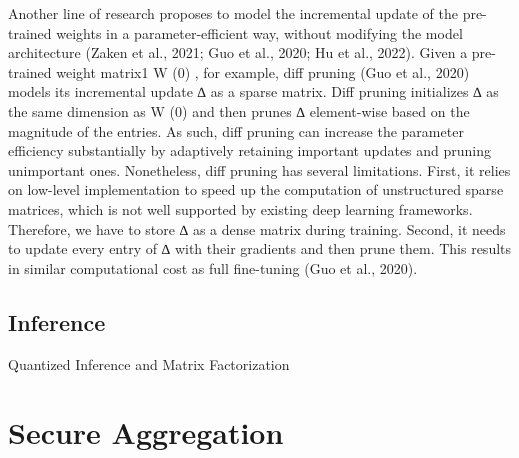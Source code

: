 \documentclass[withindex,glossary]{cam-thesis}
\begin{document}
Another line of research proposes to model the incremental update of the pre-trained weights in a parameter-efficient way, without modifying the model architecture (Zaken et al., 2021; Guo et al., 2020; Hu et al., 2022). Given a pre-trained weight matrix1 W (0) , for example, diff pruning (Guo et al., 2020) models its incremental update ∆ as a sparse matrix. Diff pruning initializes ∆ as the same dimension as W (0) and then prunes ∆ element-wise based on the magnitude of the entries. As such, diff pruning can increase the parameter efficiency substantially by adaptively retaining important updates and pruning unimportant ones. Nonetheless, diff pruning has several limitations. First, it relies on low-level implementation to speed up the computation of unstructured sparse matrices, which is not well supported by existing deep learning frameworks. Therefore, we have to store ∆ as a dense matrix during training. Second, it needs to update every entry of ∆ with their gradients and then prune them. This results in similar computational cost as full fine-tuning (Guo et al., 2020).
\subsection{Inference}

Quantized Inference and Matrix Factorization

\section{Secure Aggregation}
\end{document}
